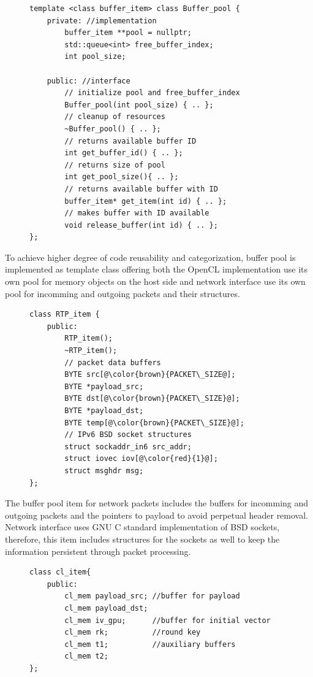 \begin{figure}[H]
\begin{lstlisting}
template <class buffer_item> class Buffer_pool {
    private: //implementation
        buffer_item **pool = nullptr;
        std::queue<int> free_buffer_index;
        int pool_size;

    public: //interface
        // initialize pool and free_buffer_index
        Buffer_pool(int pool_size) { .. };
        // cleanup of resources
        ~Buffer_pool() { .. };
        // returns available buffer ID
        int get_buffer_id() { .. };
        // returns size of pool
        int get_pool_size(){ .. };
        // returns available buffer with ID
        buffer_item* get_item(int id) { .. };
        // makes buffer with ID available
        void release_buffer(int id) { .. };
};
\end{lstlisting}
\end{figure}

To achieve higher degree of code reusability and categorization, buffer pool
is implemented as template class offering both the OpenCL implementation
use its own pool for memory objects on the host side and network interface
use its own pool for incomming and outgoing packets and their structures.

\begin{figure}[H]
\begin{lstlisting}
class RTP_item {
    public:
        RTP_item();
        ~RTP_item();
        // packet data buffers
        BYTE src[@\color{brown}{PACKET\_SIZE@];
        BYTE *payload_src;
        BYTE dst[@\color{brown}{PACKET\_SIZE}@];
        BYTE *payload_dst;
        BYTE temp[@\color{brown}{PACKET\_SIZE}@];
        // IPv6 BSD socket structures
        struct sockaddr_in6 src_addr;
        struct iovec iov[@\color{red}{1}@];
        struct msghdr msg;
};
\end{lstlisting}
\end{figure}

The buffer pool item for network packets includes the buffers for incomming and 
outgoing packets and the pointers to payload to avoid perpetual header removal.
Network interface uses GNU C standard implementation of BSD sockets, therefore,
this item includes structures for the sockets as well to keep the information
persistent through packet processing.

\begin{figure}[H]
\begin{lstlisting}
class cl_item{
    public:
        cl_mem payload_src; //buffer for payload
        cl_mem payload_dst;
        cl_mem iv_gpu;      //buffer for initial vector
        cl_mem rk;          //round key
        cl_mem t1;          //auxiliary buffers
        cl_mem t2;
};
\end{lstlisting}
\end{figure}

